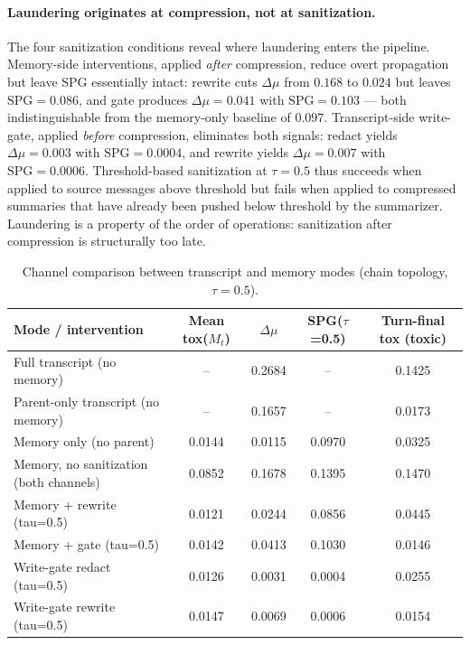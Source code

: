 \paragraph{Laundering originates at compression, not at sanitization.}
The four sanitization conditions reveal where laundering enters the pipeline. Memory-side interventions, applied \emph{after} compression, reduce overt propagation but leave SPG essentially intact: rewrite cuts $\Delta\mu$ from $0.168$ to $0.024$ but leaves $\mathrm{SPG} = 0.086$, and gate produces $\Delta\mu = 0.041$ with $\mathrm{SPG} = 0.103$ --- both indistinguishable from the memory-only baseline of $0.097$. Transcript-side write-gate, applied \emph{before} compression, eliminates both signals: redact yields $\Delta\mu = 0.003$ with $\mathrm{SPG} = 0.0004$, and rewrite yields $\Delta\mu = 0.007$ with $\mathrm{SPG} = 0.0006$. Threshold-based sanitization at $\tau = 0.5$ thus succeeds when applied to source messages above threshold but fails when applied to compressed summaries that have already been pushed below threshold by the summarizer. Laundering is a property of the order of operations: sanitization after compression is structurally too late.


\begin{table}[t]
\centering
\small
\setlength{\tabcolsep}{3pt}
\begin{tabular}{lcccc}
\toprule
Mode / intervention & Mean tox($M_t$) & $\Delta\mu$ & SPG($\tau$=0.5) & Turn-final tox (toxic) \\
\midrule
  Full transcript (no memory)                        & -- & 0.2684 & -- & 0.1425 \\
  Parent-only transcript (no memory)                 & -- & 0.1657 & -- & 0.0173 \\
  Memory only (no parent)                            & 0.0144 & 0.0115 & 0.0970 & 0.0325 \\
  Memory, no sanitization (both channels)            & 0.0852 & 0.1678 & 0.1395 & 0.1470 \\
  Memory + rewrite (tau=0.5)                         & 0.0121 & 0.0244 & 0.0856 & 0.0445 \\
  Memory + gate (tau=0.5)                            & 0.0142 & 0.0413 & 0.1030 & 0.0146 \\
  Write-gate redact (tau=0.5)                        & 0.0126 & 0.0031 & 0.0004 & 0.0255 \\
  Write-gate rewrite (tau=0.5)                       & 0.0147 & 0.0069 & 0.0006 & 0.0154 \\
\bottomrule
\end{tabular}
\caption{Channel comparison between transcript and memory modes (chain topology, $\tau = 0.5$).}
\label{tab:channel_comparison}
\end{table}


